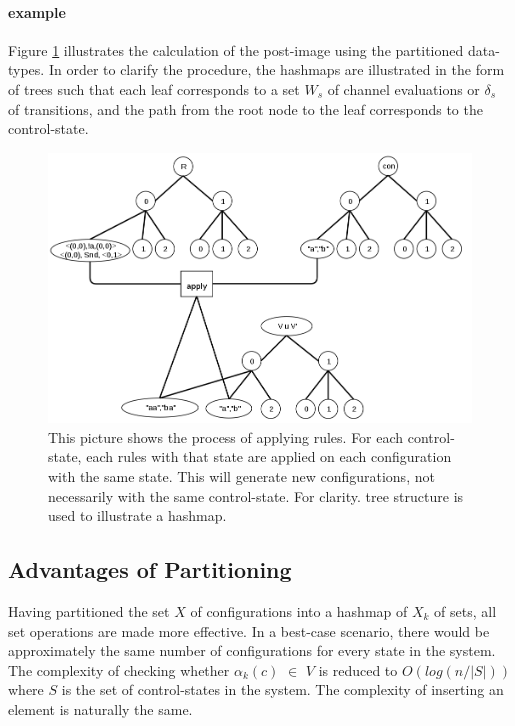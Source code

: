 \paragraph{example}
Figure \ref{applyrule} illustrates the calculation of the post-image using the partitioned data-types. In order to clarify the procedure, the hashmaps are illustrated in the form of trees such that each leaf corresponds to a set $W_s$ of channel evaluations or $\delta_s$ of transitions, and the path from the root node to the leaf corresponds to the control-state.

\begin{figure}
\includegraphics[width=400pt] {bilder/applyrule.png}
\caption{This picture shows the process of applying rules. For each control-state, each rules with that state are applied on each configuration with the same state. This will generate new configurations, not necessarily with the same control-state. For clarity.  tree structure is used to illustrate a hashmap.}
\label{applyrule}
\end{figure}



\subsection{Advantages of Partitioning}
Having partitioned the set $X$ of configurations into a hashmap of $X_k$ of sets, all set operations are made more effective. In a best-case scenario, there would be approximately the same number of configurations for every state in the system. The complexity of checking whether $\alpha_k(c)$ $\in$ $V$ is reduced to $O(log (n/|S|))$ where $S$ is the set of control-states in the system. The complexity of inserting an element is naturally the same.

